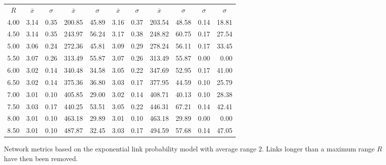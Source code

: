 \documentclass{article}
\begin{document}
\begin{figure}[h]
\begin{center}
\begin{tabular}{|r|rr|rr|rr|rr|rr|}
\hline
\multicolumn{1}{|c|}{$R$} & \multicolumn{1}{|c}{$\overline{x}$} & \multicolumn{1}{c|}{$\sigma$} & \multicolumn{1}{|c}{$\overline{x}$} & \multicolumn{1}{c|}{$\sigma$} & \multicolumn{1}{|c}{$\overline{x}$} & \multicolumn{1}{c|}{$\sigma$} & \multicolumn{1}{|c}{$\overline{x}$} & \multicolumn{1}{c|}{$\sigma$} & \multicolumn{1}{|c}{$\sigma$} & \multicolumn{1}{c|}{$\sigma$}\\
4.00 & 3.14 & 0.35 & 200.85 & 45.89 & 3.16 & 0.37 & 203.54 & 48.58 & 0.14 & 18.81\\
4.50 & 3.14 & 0.35 & 243.97 & 56.24 & 3.17 & 0.38 & 248.82 & 60.75 & 0.17 & 27.54\\
5.00 & 3.06 & 0.24 & 272.36 & 45.81 & 3.09 & 0.29 & 278.24 & 56.11 & 0.17 & 33.45\\
5.50 & 3.07 & 0.26 & 313.49 & 55.87 & 3.07 & 0.26 & 313.49 & 55.87 & 0.00 & 0.00\\
6.00 & 3.02 & 0.14 & 340.48 & 34.58 & 3.05 & 0.22 & 347.69 & 52.95 & 0.17 & 41.00\\
6.50 & 3.02 & 0.14 & 375.36 & 36.80 & 3.03 & 0.17 & 377.95 & 44.59 & 0.10 & 25.79\\
7.00 & 3.01 & 0.10 & 405.85 & 29.00 & 3.02 & 0.14 & 408.71 & 40.13 & 0.10 & 28.38\\
7.50 & 3.03 & 0.17 & 440.25 & 53.51 & 3.05 & 0.22 & 446.31 & 67.21 & 0.14 & 42.41\\
8.00 & 3.01 & 0.10 & 463.18 & 29.89 & 3.01 & 0.10 & 463.18 & 29.89 & 0.00 & 0.00\\
8.50 & 3.01 & 0.10 & 487.87 & 32.45 & 3.03 & 0.17 & 494.59 & 57.68 & 0.14 & 47.05\\
\hline
\end{tabular}
\caption{Network metrics based on the exponential link probability model with average range $2$. Links longer than a maximum range $R$ have then been removed.}
\label{exp_exp_r}
\end{center}
\end{figure}
\end{document}
